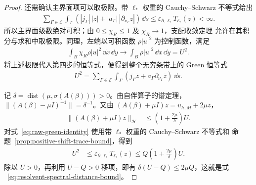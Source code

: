 \begin{proof}
  还需确认主界面项可以取极限。带 $\ell_*$ 权重的 Cauchy--Schwarz 不等式给出
  \begin{align*}
    \sum_{\Gamma\in\mathscr E}\int_\Gamma
      \left(|j_\Gamma|\,|z|
        +|a_\Gamma|\,|\partial_{\nu_\Gamma}z|\right)\,\dd s
    \leq\varepsilon_{\partial,\ell_*}T_{\ell_*}(z)<\infty.
  \end{align*}
  所以主界面级数绝对可积；由 $0\leq\chi_R\leq1$ 及 $\chi_R\to1$，支配收敛定理
  允许在其积分与求和中取极限。同理，左端以可积函数 $\rho|u|^2$ 为控制函数，满足
  \begin{align*}
    \int_B\chi_R\rho|u|^2\,\dd x\,\dd y
    \longrightarrow\int_B\rho|u|^2\,\dd x\,\dd y=U^2.
  \end{align*}
  将上述极限代入第四步的恒等式，便得到整个无穷条带上的 Green 恒等式
  \begin{align}
    U^2
    =\sum_{\Gamma\in\mathscr E}
    \int_\Gamma
    \left(
      j_\Gamma\overline z
      +a_\Gamma\partial_{\nu_\Gamma}\overline z
    \right)\,\dd s.
    \label{eq:raw-green-identity}
  \end{align}

  记
  $\delta=\operatorname{dist}(\mu,\sigma(A(\beta)))>0$。由自伴算子的谱定理，
  $\lVert(A(\beta)-\mu I)^{-1}\rVert=\delta^{-1}$。又由
  $(A(\beta)+\mu I)z=u_{h,M}+2\mu z$，
  \begin{align}
    \lVert(A(\beta)+\mu I)z\rVert_{\mathcal H}
    &\leq\left(1+\frac{2\mu}{\delta}\right)U.
    \label{eq:positive-shift-of-resolvent}
  \end{align}
  对式~\eqref{eq:raw-green-identity} 使用带 $\ell_*$ 权重的 Cauchy--Schwarz 不等式和
  命题~\ref{prop:positive-shift-trace-bound}，得到
  \begin{align*}
    U^2
    &\leq\varepsilon_{\partial,\ell_*}T_{\ell_*}(z)
    \leq Q\left(1+\frac{2\mu}{\delta}\right)U.
  \end{align*}
  除以 $U>0$，再利用 $U-Q>0$ 移项，即有
  $\delta(U-Q)\leq2\mu Q$，这就是式
  ~\eqref{eq:resolvent-spectral-distance-bound}。
\end{proof}

